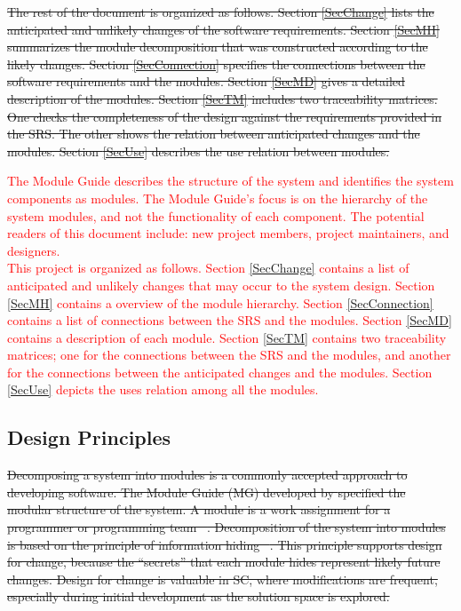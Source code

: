 \documentclass[12pt, titlepage]{article}
\begin{document}
\sout{\noindent The rest of the document is organized as follows. Section \ref{SecChange} lists the anticipated and unlikely changes of the software requirements. Section \ref{SecMH} summarizes the module decomposition that was constructed according to the likely changes. Section \ref{SecConnection} specifies the connections between the software requirements and the modules. Section \ref{SecMD} gives a detailed description of the modules. Section \ref{SecTM} includes two traceability matrices. One checks the completeness of the design against the requirements provided in the SRS. The other shows the relation between anticipated changes and the modules. Section \ref{SecUse} describes the use relation between modules.}

\textcolor{red}{The Module Guide describes the structure of the system and identifies the system components as modules. The Module Guide's focus is on the hierarchy of the system modules, and not the functionality of each component. The potential readers of this document include: new project members, project maintainers, and designers.}\\

\textcolor{red}{This project is organized as follows. Section \ref{SecChange} contains a list of anticipated and unlikely changes that may occur to the system design. Section \ref{SecMH} contains a overview of the module hierarchy. Section \ref{SecConnection} contains a list of connections between the SRS and the modules. Section \ref{SecMD} contains a description of each module. Section \ref{SecTM} contains two traceability matrices; one for the connections between the SRS and the modules, and another for the connections between the anticipated changes and the modules. Section \ref{SecUse} depicts the uses relation among all the modules.}

\subsection{Design Principles}
\sout{Decomposing a system into modules is a commonly accepted approach to developing software. The Module Guide (MG) developed by \mbox{\citep{ParnasEtAl1984}} specified the modular structure of the system. A module is a work assignment for a programmer or programming team \mbox{~\citep{ParnasEtAl1984}}. Decomposition of the system into modules is based on the principle of information hiding \mbox{~\citep{Parnas1972a}}. This principle supports design for change, because the ``secrets'' that each module hides represent likely future changes. Design for change is valuable in SC, where modifications are frequent, especially during initial development as the solution space is explored.}\\
\end{document}
